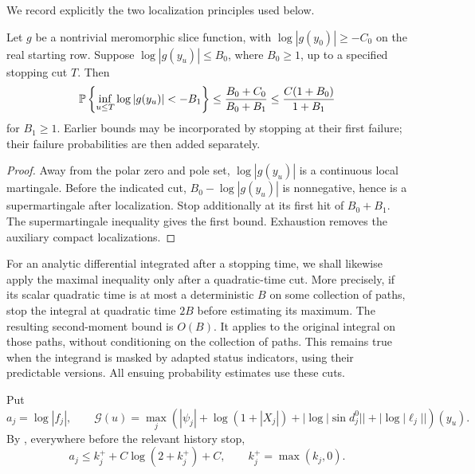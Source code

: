 We record explicitly the two localization principles used below.

\begin{lemma}
\label{odd:log-deficit}
Let \(g\) be a nontrivial meromorphic slice function, with
\(\log|g(y_0)|\ge-C_0\) on the real starting row.  Suppose
\(\log|g(y_u)|\le B_0\), where \(B_0\ge1\), up to a specified stopping
cut \(T\).  Then
\begin{equation}
 \mathbb P\left\{\inf_{u\le T}\log|g(y_u)|<-B_1\right\}
     \le \frac{B_0+C_0}{B_0+B_1}
     \le\frac{C(1+B_0)}{1+B_1}
 \label{odd:log-deficit-probability}
\end{equation}
for \(B_1\ge1\).  Earlier bounds may be incorporated by stopping at their
first failure; their failure probabilities are then added separately.
\end{lemma}

\begin{proof}
Away from the polar zero and pole set, \(\log|g(y_u)|\) is a continuous
local martingale.  Before the indicated cut,
\(B_0-\log|g(y_u)|\) is nonnegative, hence is a supermartingale after
localization.  Stop additionally at its first hit of \(B_0+B_1\).
The supermartingale inequality gives the first bound.  Exhaustion removes
the auxiliary compact localizations.
\end{proof}

For an analytic differential integrated after a stopping time, we shall
likewise apply the maximal inequality only after a quadratic-time cut.
More precisely, if its scalar quadratic time is at most a deterministic
\(B\) on some collection of paths, stop the integral at quadratic time
\(2B\) before estimating its maximum.  The resulting second-moment bound
is \(O(B)\).  It applies to the original integral on those paths, without
conditioning on the collection of paths.  This remains true when the
integrand is masked by adapted status indicators, using their predictable
versions.  All ensuing probability estimates use these cuts.

Put
\begin{equation}
 a_j=\log|f_j|,
 \qquad
 \mathcal G(u)=\max_j\left(
  |\psi_j|+\log(1+|X_j|)
       +|\log|\sin d_j^0||+|\log|\ell_j||\right)(y_u).
 \label{odd:geometry-size}
\end{equation}
By , everywhere before the relevant
history stop,
\begin{equation}
 a_j\le k_j^++C\log(2+k_j^+)+C,
 \qquad k_j^+=\max(k_j,0).
 \label{odd:amplitude-upper}
\end{equation}

